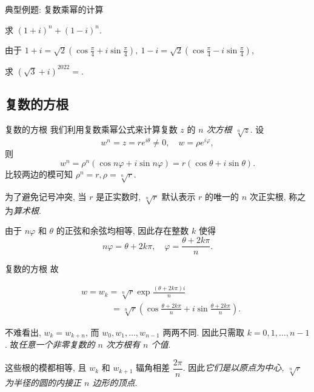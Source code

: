 \begin{frame}{典型例题: 复数乘幂的计算}
	\onslide<+->
	\begin{example}
		求 $(1+i)^n+(1-i)^n$.
	\end{example}

	\onslide<+->
	\begin{solution}
		由于 $\displaystyle 1+i=\sqrt2\left(\cos\frac\pi4+i\sin\frac\pi4\right),\ 
		1-i=\sqrt2\left(\cos\frac\pi4-i\sin\frac\pi4\right)$,
		\vspace{-\baselineskip}
	\end{solution}

	\onslide<+->
	\begin{exercise}
		求 $(\sqrt3+i)^{2022}=$.
	\end{exercise}
\end{frame}


\subsection{复数的方根}
\begin{frame}{复数的方根}
	\onslide<+->
	我们利用复数乘幂公式来计算复数 $z$ 的 \emph{$n$ 次方根 $\sqrt[n]z$}.
	\onslide<+->
	设
	\[w^n=z=re^{i\theta}\neq0,\quad w=\rho e^{i\varphi},\]
	\onslide<+->
	则
	\[w^n=\rho^n(\cos{n\varphi}+i\sin{n\varphi})=r(\cos\theta+i\sin\theta).\]
	\onslide<+->
	比较两边的模可知 $\rho^n=r,\rho=\sqrt[n]r$.

	\onslide<+->
	为了避免记号冲突, 当 $r$ 是正实数时, $\sqrt[n]r$ 默认表示 $r$ 的唯一的 $n$ 次正实根, 称之为\emph{算术根}.

	\onslide<+->
	由于 $n\varphi$ 和 $\theta$ 的正弦和余弦均相等, 因此存在整数 $k$ 使得
	\[n\varphi=\theta+2k\pi,\quad \varphi=\frac{\theta+2k\pi}n.\]
\end{frame}


\begin{frame}{复数的方根}
	\onslide<+->
	故
	\begin{alertblock@}
	\begin{align*}
		&w=w_k=\sqrt[n]r\exp\frac{(\theta+2k\pi)i}n\\
		&\hspace{42pt}=\sqrt[n]r\left(\cos\frac{\theta+2k\pi}n+i\sin\frac{\theta+2k\pi}n\right).
	\end{align*}
	\end{alertblock@}

	\onslide<+->
	不难看出, $w_k=w_{k+n}$, 而 $w_0,w_1,\dots,w_{n-1}$ 两两不同.
	\onslide<+->
	因此只需取 \alert{$k=0,1,\dots,n-1$}.
	\onslide<+->
	故\emph{任意一个非零复数的 $n$ 次方根有 $n$ 个值}.

	\onslide<+->
	这些根的模都相等, 且 $w_k$ 和 $w_{k+1}$ 辐角相差 $\dfrac{2\pi}n$.
	\onslide<+->
	因此\emph{它们是以原点为中心, $\sqrt[n]r$ 为半径的圆的内接正 $n$ 边形的顶点}.
\end{frame}


